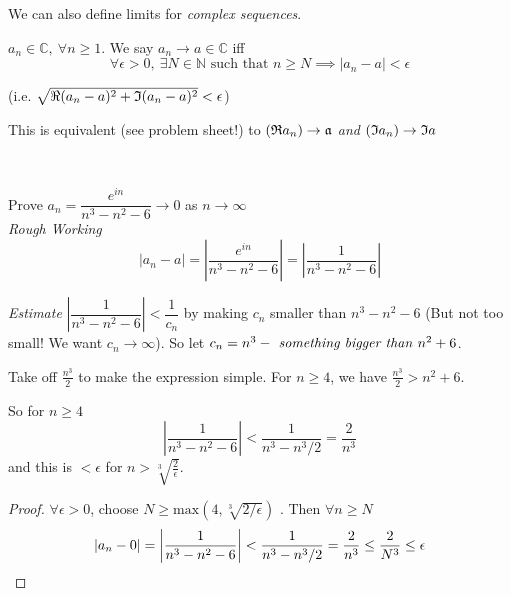 \documentclass[twoside]{scrartcl}
\begin{document}
We can also define limits for \emph{complex sequences}.\\

\begin{definition}
$a_n \in \mathbb{C},~\forall n \geq 1$. We say $a_n \to a \in \mathbb{C}$ iff
\[\forall \epsilon >0,~\exists N \in \mathbb{N} \text{ such that } n \geq N \implies |a_n - a| < \epsilon\]	

(i.e. $\sqrt{\Re(a_n-a)^2 + \frak{I}(a_n-a)^2} < \epsilon$) 

This is equivalent (see problem sheet!) to $(\frak{R}a_n) \to \frak{a}$ \emph{and} $(\frak{I}a_n) \to \frak{I}a$
\end{definition}~

\begin{example}
Prove $a_n = \dfrac{e^{in}}{n^3-n^2-6} \to 0$ as $n \to \infty$\\

\emph{Rough Working} 
\[|a_n - a| = \left|\dfrac{e^{in}}{n^3-n^2-6} \right| = \left|\frac{1}{n^3-n^2-6}\right|\]

\emph{Estimate} $\left|\dfrac{1}{n^3-n^2-6}\right| < \dfrac{1}{c_n}$ by making $c_n$ smaller than $n^3 - n^2 - 6$ (But not too small! We want $c_n \to \infty$). So let $c_n = n^3 - \text{\emph{ something bigger than} } n^2 + 6$.

Take off $\frac{n^3}{2}$ to make the expression simple. For $n \geq 4$, we have $\frac{n^3}{2} > n^2 + 6$. 

So for $n \geq 4$
\[\left|\frac{1}{n^3-n^2-6}\right| < \frac{1}{n^3- n^3/2} = \frac{2}{n^3} \]
and this is $< \epsilon$ for $n > \sqrt[3]{\frac{2}{\epsilon}}$.

\begin{proof}
$\forall \epsilon > 0$, choose $N \geq \mathrm{max}(4,\sqrt[3]{2/\epsilon})$	. Then $\forall n \geq N$
\[|a_n - 0| = \left| \frac{1}{n^3-n^2 - 6}\right| < \frac{1}{n^3- n^3/2} = \frac{2}{n^3} \leq \frac{2}{N^3} \leq \epsilon \qedhere \]
\end{proof}
\end{example}~
\end{document}
